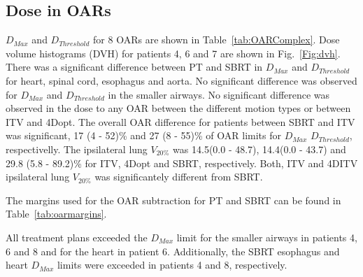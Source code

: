 \begin{table}[H]
\begin{tabular}{c|c|c|c|c}
\hline\hline
	\end{tabular}
	\label{tab:resultsComplex}
\end{table}
\newpage
\subsection{Dose in OARs}

$D_{Max}$ and $D_{Threshold}$ for 8 OARs are shown in Table~\ref{tab:OARComplex}. Dose volume histograms (DVH) for patients 4, 6 and 7 are shown in Fig.~\ref{Fig:dvh}.
There was a significant difference between PT and SBRT in $D_{Max}$ and $D_{Threshold}$ 
for heart, spinal cord, esophagus and aorta. No significant difference was observed for $D_{Max}$ and $D_{Threshold}$ in the smaller airways.
No significant difference was observed in the dose to any OAR between the different motion types or between ITV and 4Dopt.
The overall OAR difference for patients between SBRT and ITV
was significant, 17 (4 - 52)\% and 27 (8 - 55)\% of OAR limits for $D_{Max}$ $D_{Threshold}$, respectivelly.
The ipsilateral lung $V_{20\%}$ was 14.5(0.0 - 48.7), 14.4(0.0 - 43.7) and 29.8 (5.8 - 89.2)\% for ITV, 4Dopt and SBRT, respectively. Both, ITV and 4DITV ipsilateral lung $V_{20\%}$ was
significantely different from SBRT.

The margins used for the OAR subtraction for PT and SBRT can be found in Table~\ref{tab:oarmargins}.

All treatment plans exceeded the $D_{Max}$ limit for the smaller airways in patients 4, 6 and 8 and for the heart in patient 6. 
Additionally, the SBRT esophagus and heart $D_{Max}$ limits were exceeded in patients 4 and 8, respectively.


